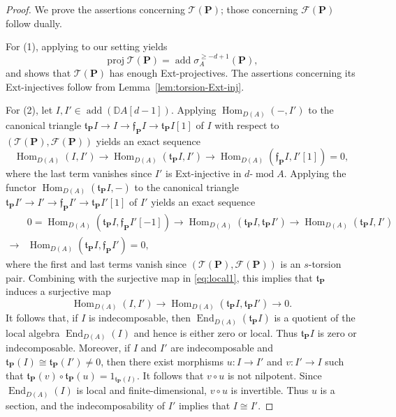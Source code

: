 \documentclass[11pt,a4paper,reqno]{amsart}
\theoremstyle{plain}
\numberwithin{equation}{section}
\theoremstyle{definition}
\providecommand{\add}{\operatorname{add}}
\renewcommand{\mod}{\operatorname{mod}}
\newcommand{\Hom}{\operatorname{Hom}}
\newcommand{\End}{\operatorname{End}}
\newcommand{\Proj}{\operatorname{proj}}
\newcommand{\emod}[2]{#1\text{-}\!\mod #2}
\newcommand{\PP}{\mathbf{P}}
\newcommand{\T}{\mathcal{T}}
\newcommand{\F}{\mathcal{F}}
\begin{document}
\begin{proof}
We prove the assertions concerning $\T(\PP)$; those concerning $\F(\PP)$ follow dually.

For (1), applying \cite[Proposition~2.12(a),(c)]{WZ} to our setting yields
\[
 \Proj\T(\PP)=\add\sigma_A^{\geq-d+1}(\PP),
\]
and shows that $\T(\PP)$ has enough Ext-projectives. The assertions concerning its Ext-injectives follow from Lemma~\ref{lem:torsion-Ext-inj}.

For (2), let $I,I'\in\add(\mathbb D A[d-1])$. Applying $\Hom_{D(A)}(-,I')$ to the canonical triangle $\mathfrak{t}_{\PP} I\to I\to \mathfrak{f}_{\PP} I\to \mathfrak{t}_{\PP} I[1]$ of $I$ with respect to $(\T(\PP),\F(\PP))$ yields an exact sequence
\begin{equation}\label{eq:local1}
    \Hom_{D(A)}(I,I')\to\Hom_{D(A)}(\mathfrak{t}_{\PP}I, I')\to\Hom_{D(A)}(\mathfrak{f}_{\PP}I,I'[1])=0,
\end{equation}
where the last term vanishes since $I'$ is Ext-injective in $\emod{d}{A}$. Applying the functor $\Hom_{D(A)}(\mathfrak{t}_{\PP}I,-)$ to the canonical triangle $\mathfrak{t}_{\PP} I'\to I'\to \mathfrak{f}_{\PP} I'\to \mathfrak{t}_{\PP} I'[1]$ of $I'$ yields an exact sequence
\[\begin{array}{rl}
    & 0=\Hom_{D(A)}(\mathfrak{t}_{\PP}I,\mathfrak{f}_{\PP}I'[-1])\to \Hom_{D(A)}(\mathfrak{t}_{\PP}I,\mathfrak{t}_{\PP}I')\to \Hom_{D(A)}(\mathfrak{t}_{\PP}I, I')\\
    \to & \Hom_{D(A)}(\mathfrak{t}_{\PP}I,\mathfrak{f}_{\PP}I')=0,
\end{array}\]
where the first and last terms vanish since $(\T(\PP),\F(\PP))$ is an $s$-torsion pair. Combining with the surjective map in \eqref{eq:local1}, this implies that $\mathfrak{t}_{\PP}$ induces a surjective map 
\[\Hom_{D(A)}(I,I')\to \Hom_{D(A)}(\mathfrak{t}_{\PP}I,\mathfrak{t}_{\PP}I')\to0.\]
It follows that, if $I$ is indecomposable, then $\End_{D(A)}(\mathfrak{t}_{\PP}I)$ is a quotient of the local algebra $\End_{D(A)}(I)$ and hence is either zero or local. Thus $\mathfrak{t}_{\PP}I$ is zero or indecomposable. Moreover, if $I$ and $I'$ are indecomposable and $\mathfrak{t}_{\PP}(I)\cong\mathfrak{t}_{\PP}(I')\neq 0$, then there exist morphisms $u:I\to I'$ and $v:I'\to I$ such that $\mathfrak{t}_{\PP}(v)\circ\mathfrak{t}_{\PP}(u)=1_{\mathfrak{t}_{\PP}(I)}$. It follows that $v\circ u$ is not nilpotent. Since $\End_{D(A)}(I)$ is local and finite-dimensional, $v\circ u$ is invertible. Thus $u$ is a section, and the indecomposability of $I'$ implies that $I\cong I'$.


\end{proof}
\end{document}
